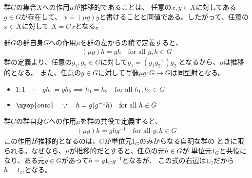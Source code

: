 	群$G$の集合$X$への作用$\mu$が推移的であることは、
	任意の$x,y\in X$に対してある$g\in G$が存在して、
	$x=(\mu g)y$と書けることと同値である。したがって、任意の$x\in X$に対して
	$X=Gx$となる。

	\begin{example}[群自身への左作用]\label{eg:群自身への左作用} %
		群$G$の群自身$G$への作用$\mu$を群の左からの積で定義すると、
		\begin{equation*}\begin{split} %
			(\mu g)h = gh \quad\text{for all }g,h\in G
		\end{split}\end{equation*} %
		群の定義より、任意の$g_1,g_2\in G$に対して$g_1=(g_1g_2^{-1})g_2$
		となるから、$\mu$は推移的となる。
		また、任意の$g\in G$に対して写像$\mu g:G\to G$は同型射となる。
		\begin{itemize}\setlength{\itemsep}{-1mm} %
			\item $1:1\quad\because\quad
				gh_1 = gh_2 \implies h_1 = h_2 \quad\text{for all }h_1,h_2\in G
			$
			\item $\myop{onto}\quad\because\quad
				h = g(g^{-1}h) \quad\text{for all }h\in G
			$
		\end{itemize} %
	\end{example} %

	\begin{example}[群自身への共役による作用]\label{eg:群自身への共役による作用} %
		群$G$の群自身$G$への作用$\mu$を群の共役で定義すると、
		\begin{equation*}\begin{split} %
			(\mu g)h = ghg^{-1} \quad\text{for all }g,h\in G
		\end{split}\end{equation*} %
		この作用が推移的となるのは、$G$が単位元$1_G$のみからなる自明な群の
		ときに限られる。なぜなら、$\mu$が推移的だとすると、任意の元$h\in G$が
		単位元$1_G$と共役になり、ある元$g\in G$があって$h=g1_Gg^{-1}$となるが、
		この式の右辺は$1_G$だから$h=1_G$となる。
	\end{example} %

